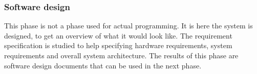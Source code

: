 \subsubsection{Software design}


This phase is not a phase used for actual programming. It is here the system is designed, to 
get an overview of what it would look like\cite{waterfallexplained}. The requirement 
specification is studied to help specifying hardware requirements, system requirements and 
overall system architecture\cite{waterfallexplained}.  The results of this phase are 
software design documents that can be used in the next phase\cite{waterfallexplained}.